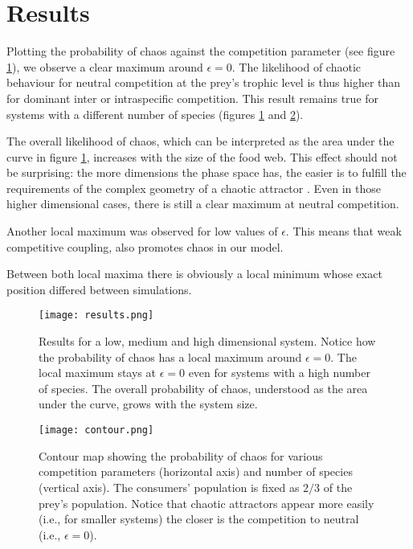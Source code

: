\section{Results}
\label{sec:Results}
Plotting the probability of chaos against the competition parameter (see figure \ref{fig:Results}), we observe a clear maximum around $ \epsilon = 0 $. The likelihood of chaotic behaviour for neutral competition at the prey's trophic level is thus higher than for dominant inter or intraspecific competition. This result remains true for systems with a different number of species (figures \ref{fig:Results} and \ref{fig:Contour}).

The overall likelihood of chaos, which can be interpreted as the area under the curve in figure \ref{fig:Results}, increases with the size of the food web. This effect should not be surprising: the more dimensions the phase space has, the easier is to fulfill the requirements of the complex geometry of a chaotic attractor \cite{Strogatz1994}. Even in those higher dimensional cases, there is still a clear maximum at neutral competition.

Another local maximum was observed for low values of $ \epsilon $. This means that weak competitive coupling, also promotes chaos in our model.

Between both local maxima there is obviously a local minimum whose exact position differed between simulations.

\begin{figure}
	\begin{center}
		\texttt{[image: results.png]}
	\end{center}
	\caption{Results for a low, medium and high dimensional system. Notice how the probability of chaos has a local maximum around $\epsilon = 0$. The local maximum stays at $\epsilon = 0$ even for systems with a high number of species. The overall probability of chaos, understood as the area under the curve, grows with the system size. }
	\label{fig:Results}
\end{figure}

\begin{figure}
	\begin{center}
		\texttt{[image: contour.png]}
	\end{center}
	\caption{Contour map showing the probability of chaos for various competition parameters (horizontal axis) and number of species (vertical axis). The consumers' population is fixed as $ 2/3 $ of the prey's population. Notice that chaotic attractors appear more easily (i.e., for smaller systems) the closer is the competition to neutral (i.e., $ \epsilon = 0 $).}
	\label{fig:Contour}
\end{figure}